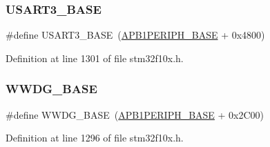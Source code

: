 \subsubsection{\texorpdfstring{U\+S\+A\+R\+T3\+\_\+\+B\+A\+SE}{USART3\_BASE}}
{\footnotesize\ttfamily \#define U\+S\+A\+R\+T3\+\_\+\+B\+A\+SE~(\hyperlink{group___peripheral__memory__map_ga45666d911f39addd4c8c0a0ac3388cfb}{A\+P\+B1\+P\+E\+R\+I\+P\+H\+\_\+\+B\+A\+SE} + 0x4800)}



Definition at line 1301 of file stm32f10x.\+h.

\mbox{\label{group___peripheral__memory__map_ga9a5bf4728ab93dea5b569f5b972cbe62}} 
\subsubsection{\texorpdfstring{W\+W\+D\+G\+\_\+\+B\+A\+SE}{WWDG\_BASE}}
{\footnotesize\ttfamily \#define W\+W\+D\+G\+\_\+\+B\+A\+SE~(\hyperlink{group___peripheral__memory__map_ga45666d911f39addd4c8c0a0ac3388cfb}{A\+P\+B1\+P\+E\+R\+I\+P\+H\+\_\+\+B\+A\+SE} + 0x2\+C00)}



Definition at line 1296 of file stm32f10x.\+h.

